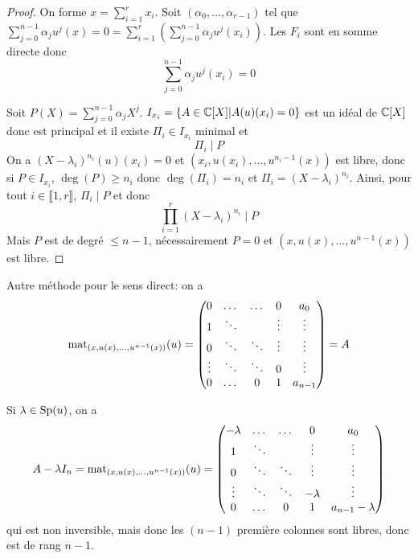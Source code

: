 \documentclass[12pt]{article}
\begin{document}
\begin{proof}
	On forme $x=\sum_{i=1}^{r}x_{i}$. Soit $(\alpha_{0},\dots,\alpha_{r-1})$ tel que $\sum_{j=0}^{n-1}\alpha_{j}u^{j}(x)=0=\sum_{i=1}^{r}\left(\sum_{j=0}^{n-1}\alpha_{j}u^{j}(x_{i})\right)$. Les $F_{i}$ sont en somme directe donc 
	\begin{equation}
		\sum_{j=0}^{n-1}\alpha_{j}u^{j}(x_{i})=0
	\end{equation}

	Soit $P(X)=\sum_{j=0}^{n-1}\alpha_{j}X^{j}$. $I_{x_{i}}=\left\lbrace A\in\mathbb{C}[X]\middle| A(u)(x_{i})=0\right\rbrace$ est un idéal de $\mathbb{C}[X]$ donc est principal et il existe $\Pi_{i}\in I_{x_{i}}$ minimal et 
	\begin{equation}
		\Pi_{i}\mid P
	\end{equation}
	On a $(X-\lambda_{i})^{n_{i}}(u)(x_{i})=0$ et $(x_{i},u(x_{i}),\dots,u^{n_{i}-1}(x))$ est libre, donc si $P\in I_{x_{i}}$, $\deg(P)\geqslant n_{i}$ donc $\deg(\Pi_{i})=n_{i}$ et $\Pi_{i}=(X-\lambda_{i})^{n_{i}}$. Ainsi, pour tout $i\in\llbracket1,r\rrbracket$, $\Pi_{i}\mid P$ et donc 
	\begin{equation}
		\prod_{i=1}^{r}(X-\lambda_{i})^{n_{i}}\mid P
	\end{equation}
	Mais $P$ est de degré $\leqslant n-1$, nécessairement $P=0$ et $(x,u(x),\dots,u^{n-1}(x))$ est libre.
\end{proof}

\begin{remark}
	Autre méthode pour le sens direct: on a 
	\begin{equation}
		\operatorname{mat}_{(x,u(x),\dots,u^{n-1}(x))}(u)=
		\begin{pmatrix}
			0&\dots&\dots&0&a_{0}\\
			1&\ddots&&\vdots&\vdots\\
			0&\ddots&\ddots&\vdots&\vdots\\
			\vdots&\ddots&\ddots&0&\vdots\\
			0&\dots&0&1&a_{n-1}
		\end{pmatrix}=A
	\end{equation}

	Si $\lambda\in\operatorname{Sp}(u)$, on a 
	\begin{equation}
		A-\lambda I_{n}=
		\operatorname{mat}_{(x,u(x),\dots,u^{n-1}(x))}(u)=
		\begin{pmatrix}
			-\lambda&\dots&\dots&0&a_{0}\\
			1&\ddots&&\vdots&\vdots\\
			0&\ddots&\ddots&\vdots&\vdots\\
			\vdots&\ddots&\ddots&-\lambda&\vdots\\
			0&\dots&0&1&a_{n-1}-\lambda
		\end{pmatrix}
	\end{equation}
	qui est non inversible, mais donc les $(n-1)$ première colonnes sont libres, donc est de rang $n-1$.
\end{remark}
\end{document}

